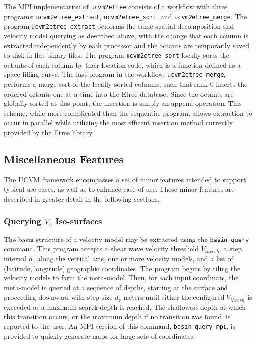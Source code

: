 The MPI implementation of \texttt{ucvm2etree} consists of a workflow with three programs: \texttt{ucvm2etree\_extract}, \texttt{ucvm2etree\_sort}, and \texttt{ucvm2etree\_merge}. The program \texttt{ucvm2etree\_extract} performs the same spatial decomposition and velocity model querying as described above, with the change that each column is extracted independently by each processor and the octants are temporarily saved to disk in flat binary files. The program \texttt{ucvm2etree\_sort} locally sorts the octants of each column by their location code, which is a function defined as a space-filling curve. The last program in the workflow, \texttt{ucvm2etree\_merge}, performs a merge sort of the locally sorted columns, such that rank 0 inserts the ordered octants one at a time into the Etree database. Since the octants are globally sorted at this point, the insertion is simply an append operation. This scheme, while more complicated than the sequential program, allows extraction to occur in parallel while utilizing the most efficent insertion method currently provided by the Etree library.

\subsection{Miscellaneous Features}

The UCVM framework encompasses a set of minor features intended to support typical use cases, as well as to enhance ease-of-use. These minor features are described in greater detail in the following sections.

\subsubsection{Querying $V_s$ Iso-surfaces}

The basin structure of a velocity model may be extracted using the \texttt{basin\_query} command. This program accepts a shear wave velocity threshold $V_{thresh}$, a step interval $d_z$ along the vertical axis, one or more velocity models, and a list of (latitude, longitude) geographic coordinates. The program begins by tiling the velocity models to form the meta-model. Then, for each input coordinate, the meta-model is queried at a sequence of depths, starting at the surface and proceeding downward with step size $d_z$ meters until either the configured $V_{thresh}$ is exceeded or a maximum search depth is reached. The shallowest depth at which this transition occurs, or the maximum depth if no transition was found, is reported to the user. An MPI version of this command, \texttt{basin\_query\_mpi}, is provided to quickly generate maps for large sets of coordinates.

